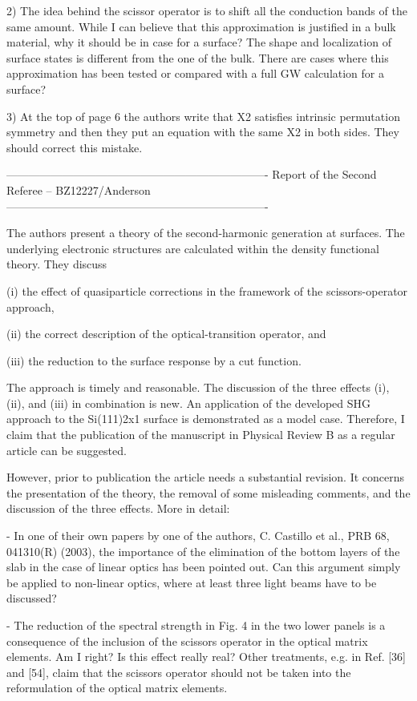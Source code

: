 2) The idea behind the scissor operator is to shift all the conduction 
bands of the same amount. While I can believe that this approximation 
is justified in a bulk material, why it should be in case for a 
surface? The shape and localization of surface states is different 
from the one of the bulk. There are cases where this approximation has 
been tested or compared with a full GW calculation for a surface? 

3) At the top of page 6 the authors write that X2 satisfies intrinsic 
permutation symmetry and then they put an equation with the same X2 in 
both sides. They should correct this mistake.

----------------------------------------------------------------------
Report of the Second Referee -- BZ12227/Anderson
----------------------------------------------------------------------

The authors present a theory of the second-harmonic generation at 
surfaces. The underlying electronic structures are calculated within 
the density functional theory. They discuss 

(i) the effect of quasiparticle corrections in the framework of the 
scissors-operator approach, 

(ii) the correct description of the optical-transition operator, and 

(iii) the reduction to the surface response by a cut function. 

The approach is timely and reasonable. The discussion of the three 
effects (i), (ii), and (iii) in combination is new. An application of 
the developed SHG approach to the Si(111)2x1 surface is demonstrated 
as a model case. Therefore, I claim that the publication of the 
manuscript in Physical Review B as a regular article can be suggested. 

However, prior to publication the article needs a substantial 
revision. It concerns the presentation of the theory, the removal of 
some misleading comments, and the discussion of the three effects. 
More in detail: 

- In one of their own papers by one of the authors, C. Castillo et 
al., PRB 68, 041310(R) (2003), the importance of the elimination of 
the bottom layers of the slab in the case of linear optics has been 
pointed out. Can this argument simply be applied to non-linear optics, 
where at least three light beams have to be discussed? 

- The reduction of the spectral strength in Fig. 4 in the two lower 
panels is a consequence of the inclusion of the scissors operator in 
the optical matrix elements. Am I right? Is this effect really real? 
Other treatments, e.g. in Ref. [36] and [54], claim that the scissors 
operator should not be taken into the reformulation of the optical 
matrix elements. 


